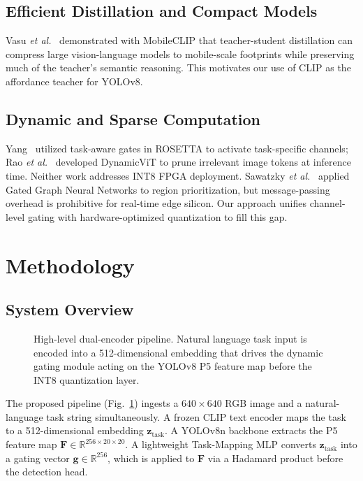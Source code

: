 \documentclass[conference]{IEEEtran}
\begin{document}
\subsection{Efficient Distillation and Compact Models}
Vasu \emph{et al.}~\cite{vasu2023mobileclip} demonstrated with MobileCLIP that
teacher-student distillation can compress large vision-language models to
mobile-scale footprints while preserving much of the teacher's semantic
reasoning. This motivates our use of CLIP as the affordance teacher for YOLOv8.

\subsection{Dynamic and Sparse Computation}
Yang~\cite{yang2022rosetta} utilized task-aware gates in ROSETTA to activate
task-specific channels; Rao \emph{et al.}~\cite{rao2021dynamicvit} developed
DynamicViT to prune irrelevant image tokens at inference time. Neither work
addresses INT8 FPGA deployment. Sawatzky \emph{et al.}~\cite{sawatzky2019affordance}
applied Gated Graph Neural Networks to region prioritization, but message-passing
overhead is prohibitive for real-time edge silicon. Our approach unifies channel-level
gating with hardware-optimized quantization to fill this gap.

\section{Methodology}

\subsection{System Overview}

\begin{figure}[htbp]
\centerline{\fbox{\rule{0pt}{3.5cm}\rule{8cm}{0pt}}}
\caption{High-level dual-encoder pipeline. Natural language task input is
encoded into a 512-dimensional embedding that drives the dynamic gating module
acting on the YOLOv8 P5 feature map before the INT8 quantization layer.}
\label{fig:pipeline}
\end{figure}

The proposed pipeline (Fig.~\ref{fig:pipeline}) ingests a $640\times640$ RGB
image and a natural-language task string simultaneously. A frozen CLIP text encoder
maps the task to a 512-dimensional embedding $\mathbf{z}_{\text{task}}$. A YOLOv8n
backbone extracts the P5 feature map $\mathbf{F}\in\mathbb{R}^{256\times20\times20}$.
A lightweight Task-Mapping MLP converts $\mathbf{z}_{\text{task}}$ into a gating
vector $\mathbf{g}\in\mathbb{R}^{256}$, which is applied to $\mathbf{F}$ via a
Hadamard product before the detection head.
\end{document}
